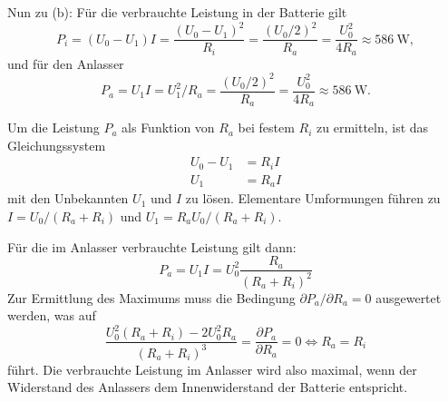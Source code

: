 \begin{enumerate}[(a)]
Nun zu (b): Für die verbrauchte Leistung in der Batterie gilt
\begin{equation}
P_i = (U_0 - U_1) I = \frac{(U_0-U_1)^2}{R_i} = \frac{(U_0/2)^2}{R_a} = \frac{U_0^2}{4R_a} \approx \SI{586}{\watt},
\end{equation}
und für den Anlasser
\begin{equation}
P_a = U_1 I = U_1^2/R_a = \frac{(U_0/2)^2}{R_a} = \frac{U_0^2}{4R_a} \approx \SI{586}{\watt}.
\end{equation}

Um die Leistung $P_a$ als Funktion von $R_a$ bei festem $R_i$ zu ermitteln, ist das Gleichungssystem
\begin{align}
U_0 - U_1 &= R_i I \\
U_1 &= R_a I
\end{align} 
mit den Unbekannten $U_1$ und $I$ zu lösen. Elementare Umformungen führen zu $I = U_0/(R_a + R_i)$ und $U_1 = R_a U_0 /(R_a + R_i)$.

Für die im Anlasser verbrauchte Leistung gilt dann:
\begin{equation}
P_a = U_1 I = U_0^2 \frac{R_a}{(R_a+R_i)^2}
\end{equation}
Zur Ermittlung des Maximums muss die Bedingung $\partial P_a / \partial R_a = 0$ ausgewertet werden, was auf 
\begin{equation}
\frac{U_0^2(R_a+R_i)-2U_0^2R_a}{(R_a+R_i)^3}=\frac{\partial P_a}{\partial R_a} = 0 \iff R_a = R_i
\end{equation}
führt. Die verbrauchte Leistung im Anlasser wird also maximal, wenn der Widerstand des Anlassers dem Innenwiderstand der Batterie entspricht.
\end{enumerate}
